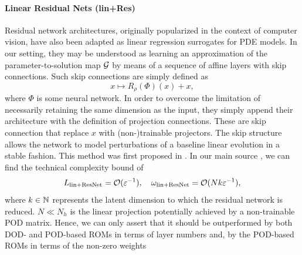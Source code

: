 \paragraph{Linear Residual Nets (lin+Res)}
Residual network architectures, originally popularized in the context of computer vision, 
have also been adapted as linear regression surrogates for PDE models. In our setting,
they may be understood as learning an approximation of the parameter-to-solution map $\mathcal{G}$
by means of a sequence of affine layers with skip connections. Such
skip connections are simply defined as 
\begin{equation*}
    x \mapsto R_\rho(\Phi)(x) + x,
\end{equation*}
where $\Phi$ is some neural network. In order to overcome the limitation of necessarily
retaining the same dimension as the input, they simply append their architecture with
the definition of projection connections. These are skip connection that replace 
$x$ with (non-)trainable projectors.
The skip structure allows
the network to model perturbations of a baseline linear evolution in a stable fashion.
This method was first proposed in \cite{kaiming2016}. In our main source \cite{brivio2023},
we can find the technical complexity bound of 
\begin{equation*}
    L_\text{lin+ResNet} = \mathcal{O}(\varepsilon^{-1}), \quad \omega_\text{lin+ResNet} = 
    \mathcal{O}(N k \varepsilon^{-1}),
\end{equation*}
where $k \in \mathbb{N}$ represents the latent dimension to which the residual network is reduced. $N \ll N_h$ is
the linear projection potentially achieved by a non-trainable POD matrix.
Hence, we can only assert that it should be outperformed by both DOD- and POD-based ROMs 
in terms of layer numbers and, by the POD-based ROMs in terms of the non-zero weights

